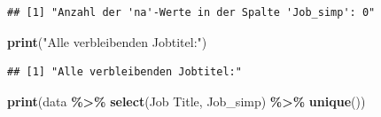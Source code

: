 \documentclass[
]{article}
\newenvironment{Shaded}{\begin{snugshade}}{\end{snugshade}}
\newcommand{\AttributeTok}[1]{\textcolor[rgb]{0.13,0.29,0.53}{#1}}
\newcommand{\CommentTok}[1]{\textcolor[rgb]{0.56,0.35,0.01}{\textit{#1}}}
\newcommand{\FunctionTok}[1]{\textcolor[rgb]{0.13,0.29,0.53}{\textbf{#1}}}
\newcommand{\NormalTok}[1]{#1}
\newcommand{\OtherTok}[1]{\textcolor[rgb]{0.56,0.35,0.01}{#1}}
\newcommand{\SpecialCharTok}[1]{\textcolor[rgb]{0.81,0.36,0.00}{\textbf{#1}}}
\newcommand{\StringTok}[1]{\textcolor[rgb]{0.31,0.60,0.02}{#1}}
\begin{document}
\begin{Shaded}
\end{Shaded}

\begin{verbatim}
## [1] "Anzahl der 'na'-Werte in der Spalte 'Job_simp': 0"
\end{verbatim}

\begin{Shaded}
\begin{Highlighting}[]
\FunctionTok{print}\NormalTok{(}\StringTok{"Alle verbleibenden Jobtitel:"}\NormalTok{)}
\end{Highlighting}
\end{Shaded}

\begin{verbatim}
## [1] "Alle verbleibenden Jobtitel:"
\end{verbatim}

\begin{Shaded}
\begin{Highlighting}[]
\FunctionTok{print}\NormalTok{(data }\SpecialCharTok{\%\textgreater{}\%} \FunctionTok{select}\NormalTok{(}\StringTok{\textasciigrave{}}\AttributeTok{Job Title}\StringTok{\textasciigrave{}}\NormalTok{, Job\_simp) }\SpecialCharTok{\%\textgreater{}\%} \FunctionTok{unique}\NormalTok{())}
\end{Highlighting}
\end{Shaded}
\end{document}
